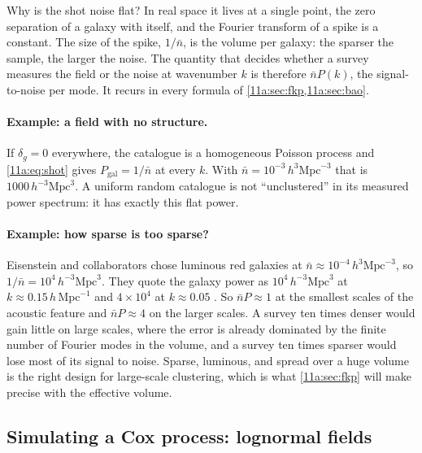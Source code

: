 Why is the shot noise flat? In real space it lives at a single point, the zero
separation of a galaxy with itself, and the Fourier transform of a spike is a
constant. The size of the spike, $1/\bar n$, is the volume per galaxy: the
sparser the sample, the larger the noise. The quantity that decides whether a
survey measures the field or the noise at wavenumber $k$ is therefore
$\bar nP(k)$, the signal-to-noise per mode. It recurs in every formula of
\cref{11a:sec:fkp,11a:sec:bao}.

\paragraph{Example: a field with no structure.}
If $\delta_g=0$ everywhere, the catalogue is a homogeneous Poisson process and
\eqref{11a:eq:shot} gives $P_{\text{gal}}=1/\bar n$ at every $k$. With
$\bar n=10^{-3}\,h^3\mathrm{Mpc}^{-3}$ that is $1000\,h^{-3}\mathrm{Mpc}^3$. A
uniform random catalogue is not ``unclustered'' in its measured power spectrum: it
has exactly this flat power.

\paragraph{Example: how sparse is too sparse?}
Eisenstein and collaborators chose luminous red galaxies at
$\bar n\approx10^{-4}\,h^3\mathrm{Mpc}^{-3}$, so $1/\bar n=10^4\,h^{-3}\mathrm{Mpc}^3$.
They quote the galaxy power as $10^4\,h^{-3}\mathrm{Mpc}^3$ at
$k\approx0.15\,h\,\mathrm{Mpc}^{-1}$ and $4\times10^4$ at $k\approx0.05$
. So $\bar nP\approx1$ at the smallest scales of the
acoustic feature and $\bar nP\approx4$ on the larger scales. A survey ten times
denser would gain little on large scales, where the error is already dominated by
the finite number of Fourier modes in the volume, and a survey ten times sparser
would lose most of its signal to noise. Sparse, luminous, and spread over a huge
volume is the right design for large-scale clustering, which is what
\cref{11a:sec:fkp} will make precise with the effective volume.

\subsection{Simulating a Cox process: lognormal fields}
\label{11a:sec:lognormal}

